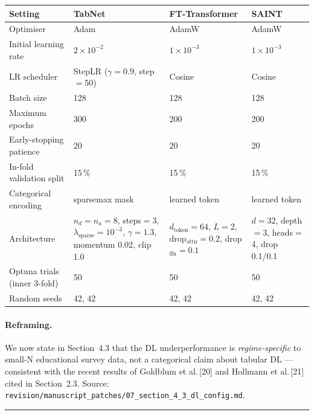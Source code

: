 \documentclass[11pt,a4paper]{article}
\newcommand{\filebox}[1]{\texttt{\small #1}}
\newcommand{\sectref}[1]{Section~#1}
\begin{document}
\begin{itemize}
\begin{center}\small
\begin{tabular}{l l l l}
\toprule
\textbf{Setting} & \textbf{TabNet} & \textbf{FT-Transformer} & \textbf{SAINT} \\
\midrule
Optimiser                  & Adam            & AdamW    & AdamW    \\
Initial learning rate      & $2\!\times\!10^{-2}$ & $1\!\times\!10^{-3}$ & $1\!\times\!10^{-3}$ \\
LR scheduler               & StepLR ($\gamma{=}0.9$, step$=$50) & Cosine & Cosine \\
Batch size                 & 128             & 128      & 128      \\
Maximum epochs             & 300             & 200      & 200      \\
Early-stopping patience    & 20              & 20       & 20       \\
In-fold validation split   & 15\,\%          & 15\,\%   & 15\,\%   \\
Categorical encoding       & sparsemax mask  & learned token & learned token \\
Architecture               & $n_d{=}n_a{=}8$, steps$=$3, $\lambda_{\text{sparse}}{=}10^{-3}$, $\gamma{=}1.3$, momentum 0.02, clip 1.0 & $d_{\text{token}}{=}64$, $L{=}2$, drop$_{\text{attn}}{=}0.2$, drop$_{\text{ffn}}{=}0.1$ & $d{=}32$, depth$=$3, heads$=$4, drop 0.1/0.1 \\
Optuna trials (inner 3-fold) & 50            & 50       & 50       \\
Random seeds               & 42, 42          & 42, 42   & 42, 42   \\
\bottomrule
\end{tabular}
\end{center}

\paragraph{Reframing.} We now state in \sectref{4.3} that the DL underperformance is \emph{regime-specific} to small-N educational survey data, not a categorical claim about tabular DL --- consistent with the recent results of Goldblum et al.\,[20] and Hollmann et al.\,[21] cited in \sectref{2.3}. Source: \filebox{revision/manuscript\_patches/07\_section\_4\_3\_dl\_config.md}.

\bigskip
\hrule
\bigskip


\end{itemize}
\end{document}
